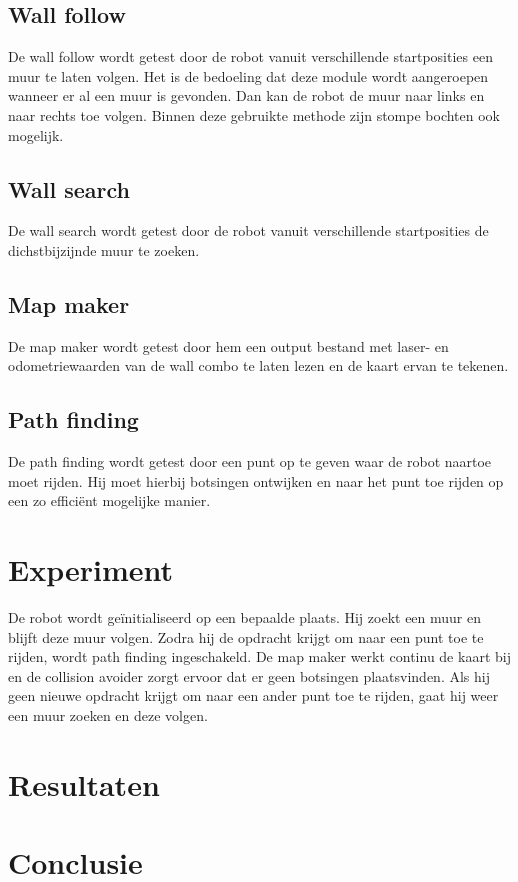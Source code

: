 \documentclass[a4paper,10pt]{article}
\begin{document}
\subsection{Wall follow}
De wall follow wordt getest door de robot vanuit verschillende startposities een muur te laten volgen. Het is de bedoeling dat deze module wordt aangeroepen wanneer er al een muur is gevonden. Dan kan de robot de muur naar links en naar rechts toe volgen. Binnen deze gebruikte methode zijn stompe bochten ook mogelijk.

\subsection{Wall search}
De wall search wordt getest door de robot vanuit verschillende startposities de dichstbijzijnde muur te zoeken. 

\subsection{Map maker}
De map maker wordt getest door hem een output bestand met laser- en odometriewaarden van de wall combo te laten lezen en de kaart ervan te tekenen.

\subsection{Path finding}
De path finding wordt getest door een punt op te geven waar de robot naartoe moet rijden. Hij moet hierbij botsingen ontwijken en naar het punt toe rijden op een zo effici\"{e}nt mogelijke manier.

\section{Experiment}
De robot wordt ge\"{i}nitialiseerd op een bepaalde plaats. Hij zoekt een muur en blijft deze muur volgen. Zodra hij de opdracht krijgt om naar een punt toe te rijden, wordt path finding ingeschakeld. De map maker werkt continu de kaart bij en de collision avoider zorgt ervoor dat er geen botsingen plaatsvinden. Als hij geen nieuwe opdracht krijgt om naar een ander punt toe te rijden, gaat hij weer een muur zoeken en deze volgen.

\section{Resultaten}
\section{Conclusie}
\end{document}
